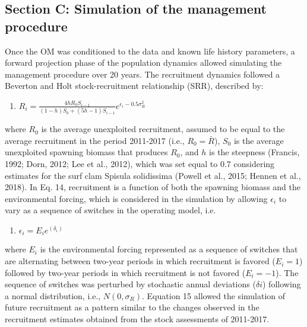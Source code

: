 \documentclass[]{article}
\providecommand{\tightlist}{%
  \setlength{\itemsep}{0pt}\setlength{\parskip}{0pt}}
\begin{document}
\hypertarget{section-c-simulation-of-the-management-procedure}{%
\subsection{Section C: Simulation of the management
procedure}\label{section-c-simulation-of-the-management-procedure}}

Once the OM was conditioned to the data and known life history
parameters, a forward projection phase of the population dynamics
allowed simulating the management procedure over 20 years. The
recruitment dynamics followed a Beverton and Holt stock-recruitment
relationship (SRR), described by:

\begin{enumerate}
\def\labelenumi{\arabic{enumi})}
\setcounter{enumi}{13}
\tightlist
\item
  \(R_i=\frac{4 h R_0 S_{i-1}}{(1-h) S_0+(5h-1) S_{i-1}} e^{\epsilon_i - 0.5\sigma_R^2}\)
\end{enumerate}

where \(R_0\) is the average unexploited recruitment, assumed to be
equal to the average recruitment in the period 2011-2017 (i.e.,
\(R_0=\bar{R}\)), \(S_0\) is the average unexploited spawning biomass
that produces \(R_0\), and \(h\) is the steepness (Francis, 1992; Dorn,
2012; Lee et al., 2012), which was set equal to 0.7 considering
estimates for the surf clam Spisula solidissima (Powell et al., 2015;
Hennen et al., 2018). In Eq. 14, recruitment is a function of both the
spawning biomass and the environmental forcing, which is considered in
the simulation by allowing \(\epsilon_i\) to vary as a sequence of
switches in the operating model, i.e.

\begin{enumerate}
\def\labelenumi{\arabic{enumi})}
\setcounter{enumi}{14}
\tightlist
\item
  \(\epsilon_i=E_i e^{(δ_i)}\)
\end{enumerate}

where \(E_i\) is the environmental forcing represented as a sequence of
switches that are alternating between two-year periods in which
recruitment is favored (\(E_i = 1\)) followed by two-year periods in
which recruitment is not favored (\(E_i = -1\)). The sequence of
switches was perturbed by stochastic annual deviations (\(\delta i\))
following a normal distribution, i.e., \(N(0,\sigma_R)\). Equation 15
allowed the simulation of future recruitment as a pattern similar to the
changes observed in the recruitment estimates obtained from the stock
assessments of 2011-2017.
\end{document}
